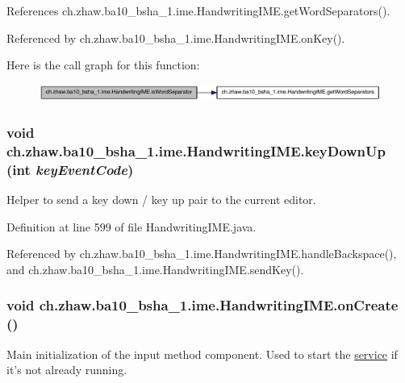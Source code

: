 References ch.zhaw.ba10\_\-bsha\_\-1.ime.HandwritingIME.getWordSeparators().

Referenced by ch.zhaw.ba10\_\-bsha\_\-1.ime.HandwritingIME.onKey().

Here is the call graph for this function:\nopagebreak
\begin{figure}[H]
\begin{center}
\leavevmode
\includegraphics[width=323pt]{classch_1_1zhaw_1_1ba10__bsha__1_1_1ime_1_1HandwritingIME_aeef9b5d4fa9f314d5bf17331645ba93b_cgraph}
\end{center}
\end{figure}
\hypertarget{classch_1_1zhaw_1_1ba10__bsha__1_1_1ime_1_1HandwritingIME_acaadb74527ea7fc306cdd571b9a25097}{
\subsubsection[{keyDownUp}]{\setlength{\rightskip}{0pt plus 5cm}void ch.zhaw.ba10\_\-bsha\_\-1.ime.HandwritingIME.keyDownUp (int {\em keyEventCode})}}
\label{classch_1_1zhaw_1_1ba10__bsha__1_1_1ime_1_1HandwritingIME_acaadb74527ea7fc306cdd571b9a25097}
Helper to send a key down / key up pair to the current editor. 

Definition at line 599 of file HandwritingIME.java.

Referenced by ch.zhaw.ba10\_\-bsha\_\-1.ime.HandwritingIME.handleBackspace(), and ch.zhaw.ba10\_\-bsha\_\-1.ime.HandwritingIME.sendKey().\hypertarget{classch_1_1zhaw_1_1ba10__bsha__1_1_1ime_1_1HandwritingIME_a391f1eb148d1c08e456d1595516c158c}{
\subsubsection[{onCreate}]{\setlength{\rightskip}{0pt plus 5cm}void ch.zhaw.ba10\_\-bsha\_\-1.ime.HandwritingIME.onCreate ()}}
\label{classch_1_1zhaw_1_1ba10__bsha__1_1_1ime_1_1HandwritingIME_a391f1eb148d1c08e456d1595516c158c}
Main initialization of the input method component. Used to start the \hyperlink{namespacech_1_1zhaw_1_1ba10__bsha__1_1_1service}{service} if it's not already running. 

